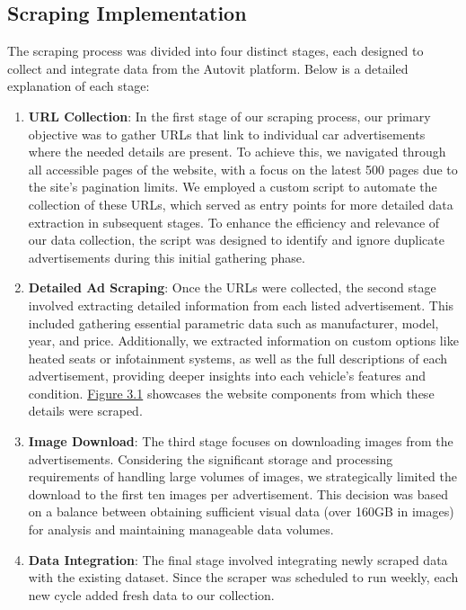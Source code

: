 \subsection{Scraping Implementation}

The scraping process was divided into four distinct stages, each designed to collect and integrate data from the Autovit platform. Below is a detailed explanation of each stage:

\begin{enumerate}
    \item \textbf{URL Collection}: In the first stage of our scraping process, our primary objective was to gather URLs that link to individual car advertisements where the needed details are present. To achieve this, we navigated through all accessible pages of the website, with a focus on the latest 500 pages due to the site's pagination limits. We employed a custom script to automate the collection of these URLs, which served as entry points for more detailed data extraction in subsequent stages. To enhance the efficiency and relevance of our data collection, the script was designed to identify and ignore duplicate advertisements during this initial gathering phase.
    \item \textbf{Detailed Ad Scraping}: Once the URLs were collected, the second stage involved extracting detailed information from each listed advertisement. This included gathering essential parametric data such as manufacturer, model, year, and price. Additionally, we extracted information on custom options like heated seats or infotainment systems, as well as the full descriptions of each advertisement, providing deeper insights into each vehicle’s features and condition. \hyperref[fig:scraping-details]{Figure 3.1} showcases the website components from which these details were scraped.
    \item \textbf{Image Download}: The third stage focuses on downloading images from the advertisements. Considering the significant storage and processing requirements of handling large volumes of images, we strategically limited the download to the first ten images per advertisement. This decision was based on a balance between obtaining sufficient visual data (over 160GB in images) for analysis and maintaining manageable data volumes.
    \item \textbf{Data Integration}: The final stage involved integrating newly scraped data with the existing dataset. Since the scraper was scheduled to run weekly, each new cycle added fresh data to our collection.
\end{enumerate}

